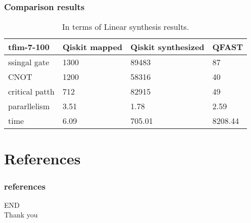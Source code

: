 \documentclass[aspectratio=1610]{beamer}
\begin{document}
\begin{frame}
  \frametitle{Comparison results}

  \begin{table}[]
    \begin{tabular}{l|lll}
    tfim-7-100  & Qiskit mapped & Qiskit synthesized & QFAST  \\\hline
    ssingal gate    & 1300          & 89483              & 87      \\
    CNOT           & 1200          & 58316              & 40      \\
    critical patth & 712           & 82915              & 49      \\
    pararllelism   & 3.51          & 1.78               & 2.59    \\
    time           & 6.09          & 705.01             & 8208.44
    \end{tabular}
    \caption{In terms of Linear synthesis results.}
    \end{table}
\end{frame}

\section{References}
\begin{frame}
	\frametitle{references}
	\printbibliography
\end{frame}
\begin{frame}
  \centering
  \Huge{END\\Thank you}
\end{frame}
\end{document}
